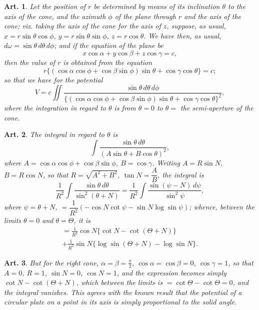 \documentclass[12pt,a4paper]{article}
\theoremstyle{cayley}
\newtheorem{art}{Art.}[section]
\begin{document}
\begin{art}
Let the position of $r$ be determined by means of its inclination $\theta$ to the axis of the cone, and the azimuth $\phi$ of the plane through $r$ and the axis of the cone; viz. taking the axis of the cone for the axis of $z$, suppose, as usual, $x = r\sin\theta\cos\phi$, $y = r\sin\theta\sin\phi$, $z = r\cos\theta$. We have then, as usual, $d\omega = \sin\theta\,d\theta\,d\phi$; and if the equation of the plane be
\[ x\cos\alpha + y\cos\beta + z\cos\gamma = c, \]
then the value of $r$ is obtained from the equation
\[ r\{(\cos\alpha\cos\phi + \cos\beta\sin\phi)\sin\theta + \cos\gamma\cos\theta\} = c; \]
so that we have for the potential
\[
V = c\iint \frac{\sin\theta\,d\theta\,d\phi}{\{(\cos\alpha\cos\phi + \cos\beta\sin\phi)\sin\theta + \cos\gamma\cos\theta\}^2},
\]
where the integration in regard to $\theta$ is from $\theta = 0$ to $\theta = $ the semi-aperture of the cone.
\end{art}

\begin{art}
The integral in regard to $\theta$ is
\[
\int \frac{\sin\theta\,d\theta}{(A\sin\theta + B\cos\theta)^2},
\]
where $A = \cos\alpha\cos\phi + \cos\beta\sin\phi$, $B = \cos\gamma$. Writing $A = R\sin N$, $B = R\cos N$, so that $R = \sqrt{A^2 + B^2}$, $\tan N = \dfrac{A}{B}$, the integral is
\[
\frac{1}{R^2}\int \frac{\sin\theta\,d\theta}{\sin^2(\theta + N)} = \frac{1}{R^2}\int \frac{\sin(\psi - N)\,d\psi}{\sin^2\psi},
\]
where $\psi = \theta + N$, $= \dfrac{1}{R^2}(-\cos N\cot\psi - \sin N\log\sin\psi)$; whence, between the limits $\theta = 0$ and $\theta = \Theta$, it is
\begin{multline*}
= \frac{1}{R^2}\cos N\{\cot N - \cot(\Theta + N)\} \\
+ \frac{1}{R^2}\sin N\{\log\sin(\Theta + N) - \log\sin N\}.
\end{multline*}
\end{art}

\begin{art}
But for the right cone, $\alpha = \beta = \frac{\pi}{2}$, $\cos\alpha = \cos\beta = 0$, $\cos\gamma = 1$, so that $A = 0$, $R = 1$, $\sin N = 0$, $\cos N = 1$, and the expression becomes simply $\cot N - \cot(\Theta + N)$, which between the limits is $= \cot\Theta - \cot\Theta = 0$, and the integral vanishes. This agrees with the known result that the potential of a circular plate on a point in its axis is simply proportional to the solid angle.
\end{art}
\end{document}
